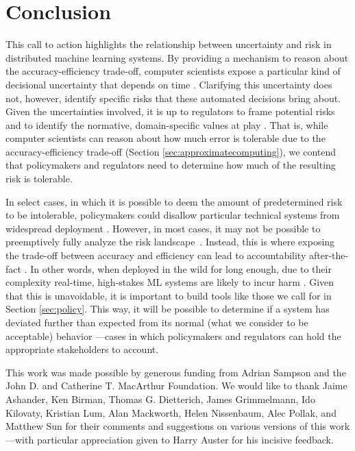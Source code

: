 \documentclass[sigplan,screen]{acmart}
\begin{document}
\section{Conclusion} \label{conclusion}
This call to action highlights the relationship between uncertainty and risk in distributed machine learning systems. By providing a mechanism to reason about the accuracy-efficiency trade-off, computer scientists expose a particular kind of decisional uncertainty that depends on time \cite{horvitz1987constraints, boddy1994deliberation}. Clarifying this uncertainty does not, however, identify specific risks that these automated decisions bring about. Given the uncertainties involved, it is up to regulators to frame potential risks and to identify the normative, domain-specific values at play \cite{jasanoff2016ethics}. That is, while computer scientists can reason about how much error is tolerable due to the accuracy-efficiency trade-off (Section \ref{sec:approximatecomputing}), we contend that policymakers and regulators need to determine how much of the resulting risk is tolerable. 

In select cases, in which it is possible to deem the amount of predetermined risk to be intolerable, policymakers could disallow particular technical systems from widespread deployment \cite{sachs2011precaution, Dietterich2018robustAI, perrow1999risk}. However, in most cases, it may not be possible to preemptively fully analyze the risk landscape~\cite{sunstein2003precaution, smith2015opportunism}. Instead, this is where exposing the trade-off between accuracy and efficiency can lead to accountability after-the-fact \cite{backes2009csar, Haeberlen2007peerreview, Lampson2004security}. In other words, when deployed in the wild for long enough, due to their complexity real-time, high-stakes ML systems are likely to incur harm \cite{perrow1999risk, vaughan1996challenger, Nissenbaum1996accountability}. Given that this is unavoidable, it is important to build tools like those we call for in Section \ref{sec:policy}. This way, it will be possible to determine if a system has deviated further than expected from its normal (what we consider to be acceptable) behavior \cite{sampson2015thesis}---cases in which policymakers and regulators can hold the appropriate stakeholders to account.

\begin{acks}
This work was made possible by generous funding from Adrian Sampson and the John D. and Catherine T. MacArthur Foundation. We would like to thank Jaime Ashander, Ken Birman, Thomas G. Dietterich, James Grimmelmann, Ido Kilovaty, Kristian Lum, Alan Mackworth, Helen Nissenbaum, Alec Pollak, and Matthew Sun for their comments and suggestions on various versions of this work---with particular appreciation given to Harry Auster for his incisive feedback.
\end{acks}
\end{document}

